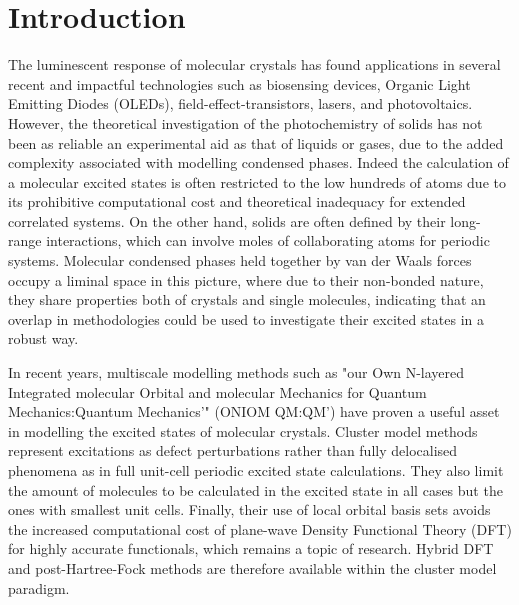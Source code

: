 \chapter*{Introduction}%
\label{Chapter1} %


\newcommand{\keyword}[1]{\textbf{#1}}
\newcommand{\tabhead}[1]{\textbf{#1}}
\newcommand{\code}[1]{\texttt{#1}}
\newcommand{\file}[1]{\texttt{\bfseries#1}}
\newcommand{\option}[1]{\texttt{\itshape#1}}


The luminescent response of molecular crystals has found applications in several recent and impactful technologies such as biosensing devices, Organic Light Emitting Diodes (OLEDs), field-effect-transistors, lasers, and photovoltaics.\cite{Li2012,Kwok2015,Huang2013,Zhao2011,Aldred2013,Gierschner2016,Hains2010,Lee2015} However, the theoretical investigation of the photochemistry of solids has not been as reliable an experimental aid as that of liquids or gases, due to the added complexity associated with modelling condensed phases. Indeed the calculation of a molecular excited states is often restricted to the low hundreds of atoms due to its prohibitive computational cost and theoretical inadequacy for extended correlated systems. On the other hand, solids are often defined by their long-range interactions, which can involve moles of collaborating atoms for periodic systems. Molecular condensed phases held together by van der Waals forces occupy a liminal space in this picture, where due to their non-bonded nature, they share properties both of crystals and single molecules, indicating that an overlap in methodologies could be used to investigate their excited states in a robust way.

In recent years, multiscale modelling methods such as "our Own N-layered Integrated molecular Orbital and molecular Mechanics for Quantum Mechanics:Quantum Mechanics'" (ONIOM QM:QM')\cite{Humbel1996,Svensson1996} have proven a useful asset in modelling the excited states of molecular crystals.\cite{Kochman2013,Kochman2013a,Presti2014,Presti2016,Presti2016a,Presti2017,Wilbraham2016a} Cluster model methods represent excitations as defect perturbations rather than fully delocalised phenomena as in full unit-cell periodic excited state calculations. They also limit the amount of molecules to be calculated in the excited state in all cases but the ones with smallest unit cells. Finally, their use of local orbital basis sets avoids the increased computational cost of plane-wave Density Functional Theory (DFT) for highly accurate functionals, which remains a topic of research.\cite{Bowler2012} Hybrid DFT and post-Hartree-Fock methods are therefore available within the cluster model paradigm.

